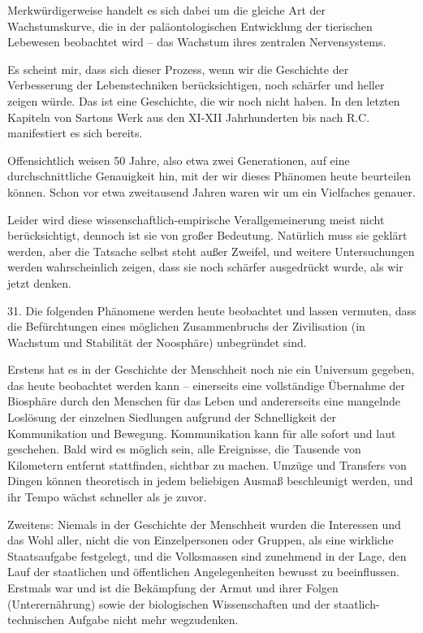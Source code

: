 \documentclass[11pt,a4paper]{book}
\begin{document}
Merkwürdigerweise handelt es sich dabei um die gleiche Art der Wachstumskurve, die in der paläontologischen Entwicklung der tierischen Lebewesen beobachtet wird -- das Wachstum ihres zentralen Nervensystems. 

Es scheint mir, dass sich dieser Prozess, wenn wir die Geschichte der Verbesserung der Lebenstechniken berücksichtigen, noch schärfer und heller zeigen würde. Das ist eine Geschichte, die wir noch nicht haben. In den letzten Kapiteln von Sartons Werk aus den XI-XII Jahrhunderten bis nach R.C. manifestiert es sich bereits. 

Offensichtlich weisen 50 Jahre, also etwa zwei Generationen, auf eine durchschnittliche Genauigkeit hin, mit der wir dieses Phänomen heute beurteilen können. Schon vor etwa zweitausend Jahren waren wir um ein Vielfaches genauer. 

Leider wird diese wissenschaftlich-empirische Verallgemeinerung meist nicht berücksichtigt, dennoch ist sie von großer Bedeutung. Natürlich muss sie geklärt werden, aber die Tatsache selbst steht außer Zweifel, und weitere Untersuchungen werden wahrscheinlich zeigen, dass sie noch schärfer ausgedrückt wurde, als wir jetzt denken. 

31. Die folgenden Phänomene werden heute beobachtet und lassen vermuten, dass die Befürchtungen eines möglichen Zusammenbruchs der Zivilisation (in Wachstum und Stabilität der Noosphäre) unbegründet sind. 

Erstens hat es in der Geschichte der Menschheit noch nie ein Universum gegeben, das heute beobachtet werden kann -- einerseits eine vollständige Übernahme der Biosphäre durch den Menschen für das Leben und andererseits eine mangelnde Loslösung der einzelnen Siedlungen aufgrund der Schnelligkeit der Kommunikation und Bewegung. Kommunikation kann für alle sofort und laut geschehen. Bald wird es möglich sein, alle Ereignisse, die Tausende von Kilometern entfernt stattfinden, sichtbar zu machen. Umzüge und Transfers von Dingen können theoretisch in jedem beliebigen Ausmaß beschleunigt werden, und ihr Tempo wächst schneller als je zuvor. 

Zweitens: Niemals in der Geschichte der Menschheit wurden die Interessen und das Wohl aller, nicht die von Einzelpersonen oder Gruppen, als eine wirkliche Staatsaufgabe festgelegt, und die Volksmassen sind zunehmend in der Lage, den Lauf der staatlichen und öffentlichen Angelegenheiten bewusst zu beeinflussen. Erstmals war und ist die Bekämpfung der Armut und ihrer Folgen (Unterernährung) sowie der biologischen Wissenschaften und der staatlich-technischen Aufgabe nicht mehr wegzudenken. 
\end{document}
